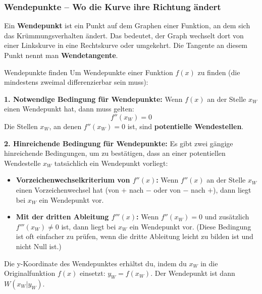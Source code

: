 \subsubsection{Wendepunkte – Wo die Kurve ihre Richtung ändert}
Ein \textbf{Wendepunkt} ist ein Punkt auf dem Graphen einer Funktion, an dem sich das Krümmungsverhalten ändert. Das bedeutet, der Graph wechselt dort von einer Linkskurve in eine Rechtskurve oder umgekehrt. Die Tangente an diesem Punkt nennt man \textbf{Wendetangente}.

\begin{merksatzumgebung}{Wendepunkte finden}
Um Wendepunkte einer Funktion $f(x)$ zu finden (die mindestens zweimal differenzierbar sein muss):

\textbf{1. Notwendige Bedingung für Wendepunkte:}
Wenn $f(x)$ an der Stelle $x_W$ einen Wendepunkt hat, dann muss gelten:
\[ f''(x_W) = 0 \]
Die Stellen $x_W$, an denen $f''(x_W)=0$ ist, sind \textbf{potentielle Wendestellen}.

\textbf{2. Hinreichende Bedingung für Wendepunkte:}
Es gibt zwei gängige hinreichende Bedingungen, um zu bestätigen, dass an einer potentiellen Wendestelle $x_W$ tatsächlich ein Wendepunkt vorliegt:
\begin{itemize}
    \item \textbf{Vorzeichenwechselkriterium von $f''(x)$:}
    Wenn $f''(x)$ an der Stelle $x_W$ einen Vorzeichenwechsel hat (von $+$ nach $-$ oder von $-$ nach $+$), dann liegt bei $x_W$ ein Wendepunkt vor.
    \item \textbf{Mit der dritten Ableitung $f'''(x)$:}
    Wenn $f''(x_W)=0$ und zusätzlich $f'''(x_W) \neq 0$ ist, dann liegt bei $x_W$ ein Wendepunkt vor. (Diese Bedingung ist oft einfacher zu prüfen, wenn die dritte Ableitung leicht zu bilden ist und nicht Null ist.)
\end{itemize}
Die y-Koordinate des Wendepunktes erhältst du, indem du $x_W$ in die Originalfunktion $f(x)$ einsetzt: $y_W = f(x_W)$. Der Wendepunkt ist dann $W(x_W|y_W)$.
\end{merksatzumgebung}
